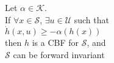 \documentclass[preview]{standalone}
\begin{document}
\begin{center}
Let $\alpha \in \mathcal{K}$.\\If $\forall x \in \mathcal{S}$, $\exists u \in \mathcal{U}$ such that \\$\dot h(x, u) \geq - \alpha(h(x))$ \\then $h$ is a CBF for $\mathcal{S}$, and \\$\mathcal{S}$ can be forward invariant
\end{center}
\end{document}
